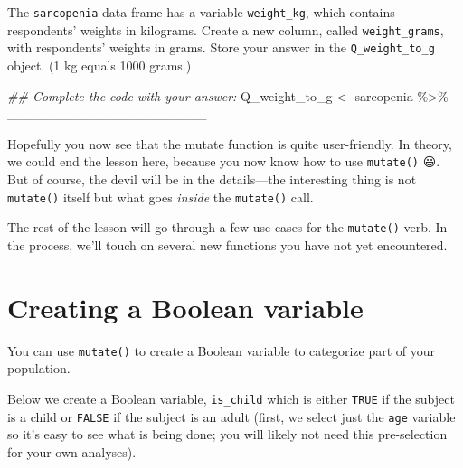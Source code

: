 \documentclass[
  letterpaper,
  DIV=11,
  numbers=noendperiod]{scrreprt}
\newenvironment{Shaded}{\begin{snugshade}}{\end{snugshade}}
\newcommand{\DocumentationTok}[1]{\textcolor[rgb]{0.37,0.37,0.37}{\textit{#1}}}
\newcommand{\NormalTok}[1]{\textcolor[rgb]{0.00,0.23,0.31}{#1}}
\newcommand{\OtherTok}[1]{\textcolor[rgb]{0.00,0.23,0.31}{#1}}
\newcommand{\SpecialCharTok}[1]{\textcolor[rgb]{0.37,0.37,0.37}{#1}}
\begin{document}
\begin{tcolorbox}[enhanced jigsaw, colframe=quarto-callout-tip-color-frame, rightrule=.15mm, opacityback=0, breakable, coltitle=black, colbacktitle=quarto-callout-tip-color!10!white, bottomrule=.15mm, leftrule=.75mm, toprule=.15mm, arc=.35mm, bottomtitle=1mm, colback=white, left=2mm, opacitybacktitle=0.6, titlerule=0mm, title=\textcolor{quarto-callout-tip-color}{\faLightbulb}\hspace{0.5em}{Practice}, toptitle=1mm]

The \texttt{sarcopenia} data frame has a variable \texttt{weight\_kg},
which contains respondents' weights in kilograms. Create a new column,
called \texttt{weight\_grams}, with respondents' weights in grams. Store
your answer in the \texttt{Q\_weight\_to\_g} object. (1 kg equals 1000
grams.)

\begin{Shaded}
\begin{Highlighting}[]
\DocumentationTok{\#\# Complete the code with your answer:}
\NormalTok{Q\_weight\_to\_g }\OtherTok{\textless{}{-}} 
\NormalTok{  sarcopenia }\SpecialCharTok{\%\textgreater{}\%} 
\NormalTok{  \_\_\_\_\_\_\_\_\_\_\_\_\_\_\_\_\_\_\_\_\_}
\end{Highlighting}
\end{Shaded}

\end{tcolorbox}

Hopefully you now see that the mutate function is quite user-friendly.
In theory, we could end the lesson here, because you now know how to use
\texttt{mutate()} 😃. But of course, the devil will be in the
details---the interesting thing is not \texttt{mutate()} itself but what
goes \emph{inside} the \texttt{mutate()} call.

The rest of the lesson will go through a few use cases for the
\texttt{mutate()} verb. In the process, we'll touch on several new
functions you have not yet encountered.

\hypertarget{creating-a-boolean-variable}{%
\section{Creating a Boolean
variable}\label{creating-a-boolean-variable}}

You can use \texttt{mutate()} to create a Boolean variable to categorize
part of your population.

Below we create a Boolean variable, \texttt{is\_child} which is either
\texttt{TRUE} if the subject is a child or \texttt{FALSE} if the subject
is an adult (first, we select just the \texttt{age} variable so it's
easy to see what is being done; you will likely not need this
pre-selection for your own analyses).
\end{document}
